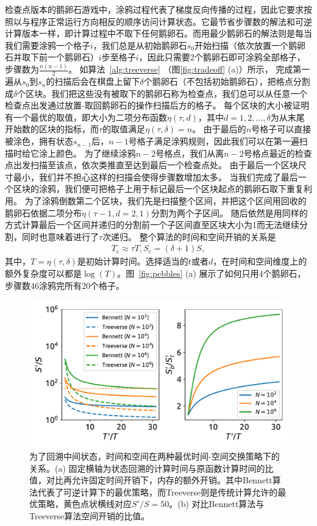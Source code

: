 \documentclass[A4,twoside,fontset=ubuntu,UTF8]{ctexart}
\begin{document}
检查点版本的鹅卵石游戏中，涂鸦过程代表了梯度反向传播的过程，因此它要求按照以与程序正常运行方向相反的顺序访问计算状态。它最节省步骤数的解法和可逆计算版本一样，即计算过程中不取下任何鹅卵石。而用最少鹅卵石的解法则是每当我们需要涂鸦一个格子$i$，我们总是从初始鹅卵石$s_0$开始扫描（依次放置一个鹅卵石并取下前一个鹅卵石）$i$步至格子$i$，因此只需要2个鹅卵石即可涂鸦全部格子，步骤数为$\frac{n(n-1)}{2}$。
如算法~\ref{alg:treeverse} （图\ref{fig:tradeoff} (a)）所示，
完成第一遍从$s_0$到$s_{n}$的扫描后会在棋盘上留下$\delta$个鹅卵石（不包括初始鹅卵石），把格点分割成$\delta$个区块。我们把这些没有被取下的鹅卵石称为检查点，我们总可以从任意一个检查点出发通过放置-取回鹅卵石的操作扫描后方的格子。
每个区块的大小被证明有一个最优的取值，即大小为二项分布函数$\eta(\tau, d)$，其中$d=1,2,\ldots, \delta$为从末尾开始数的区块的指标，而$\tau$的取值满足$\eta(\tau, \delta) = n$。
由于最后的$n$号格子可以直接被涂色，拥有状态$s_{n-1}$后，$n-1$号格子满足涂鸦规则，因此我们可以在第一遍扫描时给它涂上颜色。
为了继续涂鸦$n-2$号格点，我们从离$n-2$号格点最近的检查点出发扫描至该点，依次类推直至达到最后一个检查点处。
由于最后一个区块尺寸最小，我们并不担心这样的扫描会使得步骤数增加太多。
当我们完成了最后一个区块的涂鸦，我们便可把格子上用于标记最后一个区块起点的鹅卵石取下重复利用。
为了涂鸦倒数第二个区块，我们先是扫描整个区间，并把这个区间用回收的鹅卵石依据二项分布$\eta(\tau-1, d=2,1)$分割为两个子区间。
随后依然是用同样的方式计算最后一个区间并递归的分割前一个子区间直至区块大小为1而无法继续分割，同时也意味着进行了$\tau$次递归。
整个算法的时间和空间开销的关系是
\begin{align}
    T_c \approx \tau T, S_c = (\delta+1)S,
\end{align}
其中，$T = \eta(\tau, \delta)$是初始计算时间。选择适当的$t$或者$d$，在时间和空间维度上的额外复杂度可以都是$\log(T)$。图~\ref{fig:pebbles} (a) 展示了如何只用4个鹅卵石，步骤数46涂鸦完所有20个格子。

\begin{figure}[h]
\centering
\includegraphics[width=0.8\columnwidth]{./fig1.pdf}
    \caption{为了回溯中间状态，时间和空间在两种最优时间-空间交换策略下的关系。(a) 固定横轴为状态回溯的计算时间与原函数计算时间的比值，对比再允许固定时间开销下，内存的额外开销。其中Bennett算法代表了可逆计算下的最优策略，而Treeverse则是传统计算允许的最优策略，黄色点状横线对应$S'/S=50$。(b) 对比Bennett算法与Treeverse算法空间开销的比值。\label{fig:timespace}} 
\end{figure}
\end{document}
